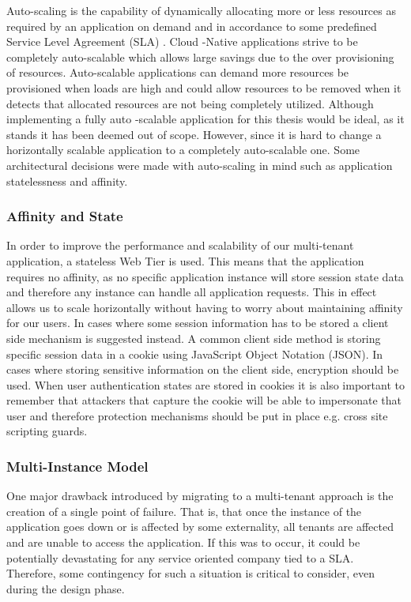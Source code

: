 Auto-scaling is the capability of dynamically allocating more or less resources as required by an application on demand and in accordance to some predefined Service Level Agreement (SLA) \cite{Homer2014}. Cloud -Native applications strive to be completely auto-scalable which allows large savings due to the over provisioning of resources. Auto-scalable applications can demand more resources be provisioned when loads are high and could allow resources to be removed when it detects that allocated resources are not being completely utilized. Although implementing a fully auto -scalable application for this thesis would be ideal, as it stands it has been deemed out of scope. However, since it is hard to change a horizontally scalable application to a completely auto-scalable one. Some architectural decisions were made with auto-scaling in mind such as application statelessness and affinity.


\subsubsection{\textbf{Affinity and State}}

In order to improve the performance and scalability of our multi-tenant application, a stateless Web Tier is used. This means that the application requires no affinity, as no specific application instance will store session state data and therefore any instance can handle all application requests. This in effect allows us to scale horizontally without having to worry about maintaining affinity for our users. In cases where some session information has to be stored a client side mechanism is suggested instead. A common client side method is storing specific session data in a cookie using JavaScript Object Notation (JSON). In cases where storing sensitive information on the client side, encryption should be used. When user authentication states are stored in cookies it is also important to remember that attackers that capture the cookie will be able to impersonate that user and therefore protection mechanisms should be put in place e.g. cross site scripting guards.


\subsubsection{\textbf{Multi-Instance Model}}
\label{sec:multiinstance}
One major drawback introduced by migrating to a multi-tenant approach is the creation of a single point of failure. That is, that once the instance of the application goes down or is affected by some externality, all tenants are affected and are unable to access the application. If this was to occur, it could be potentially devastating for any service oriented company tied to a SLA. Therefore, some contingency for such a situation is critical to consider, even during the design phase.
 
